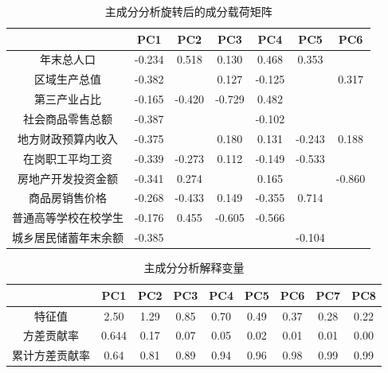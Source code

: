 \documentclass [a4paper]{article}
\begin{document}
\begin{table}[h]
\centering
\caption{主成分分析旋转后的成分载荷矩阵}
\small %
\begin{tabular}{ccccccc}
\toprule
&PC1&PC2&PC3&PC4&PC5&PC6\\
\midrule

年末总人口    &      -0.234 & 0.518 & 0.130 & 0.468 & 0.353  \\
区域生产总值  &      -0.382 &  & 0.127 & -0.125 &    & 0.317 \\
第三产业占比   &     -0.165 & -0.420 & -0.729 & 0.482&      \\
社会商品零售总额   &  -0.387 &     &     &-0.102 &     &   \\
地方财政预算内收入  & -0.375 &     & 0.180 & 0.131 & -0.243 & 0.188 \\
在岗职工平均工资  &  -0.339 & -0.273 & 0.112 & -0.149 & -0.533 &        \\
房地产开发投资金额  & -0.341 & 0.274 &      & 0.165 &    & -0.860     \\
商品房销售价格  &    -0.268 & -0.433 & 0.149 & -0.355 & 0.714     \\
普通高等学校在校学生& -0.176& 0.455 & -0.605 & -0.566 &       &       \\
城乡居民储蓄年末余额&  -0.385&     &      &    &-0.104&   \\
\bottomrule
\end{tabular}
\end{table}


\begin{table}[h]
\centering
\caption{主成分分析解释变量}
\small %
\begin{tabular}{ccccccccc}
\toprule
&PC1&PC2&PC3&PC4&PC5&PC6&PC7&PC8\\
\midrule
特征值   &  2.50 &  1.29  & 0.85 &  0.70 &  0.49  & 0.37  &0.28 & 0.22\\
方差贡献率  & 0.644  & 0.17  & 0.07  & 0.05  & 0.02 & 0.01 & 0.01 & 0.00\\
累计方差贡献率 &   0.64  & 0.81 &  0.89 &  0.94 & 0.96 &0.98 & 0.99 & 0.99\\
\bottomrule
\end{tabular}
\end{table}
\end{document}
